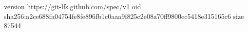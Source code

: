 version https://git-lfs.github.com/spec/v1
oid sha256:a2ce688fa04754fe8fe896fb1c0aaa9f825c2e08a70ff9800ec5418e315165c6
size 87544
